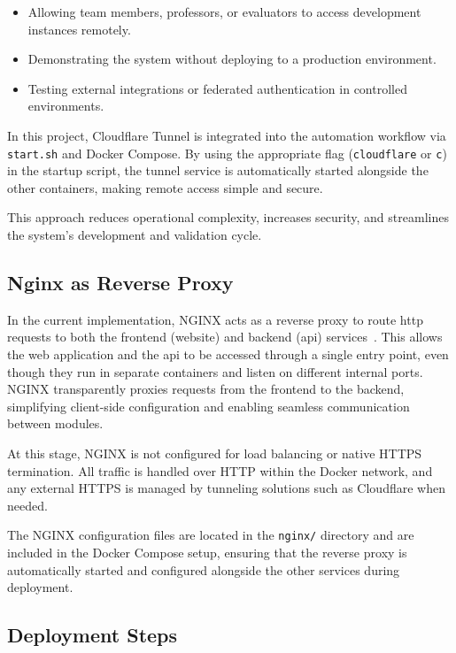 \begin{itemize}
    \item Allowing team members, professors, or evaluators to access development instances remotely.
    \item Demonstrating the system without deploying to a production environment.
    \item Testing external integrations or federated authentication in controlled environments.
\end{itemize}

In this project, Cloudflare Tunnel is integrated into the automation workflow via \texttt{start.sh} and Docker Compose. By using the appropriate flag (\texttt{cloudflare} or \texttt{c}) in the startup script, the tunnel service is automatically started alongside the other containers, making remote access simple and secure.

This approach reduces operational complexity, increases security, and streamlines the system's development and validation cycle.

\subsection{Nginx as Reverse Proxy} \label{subsec:nginx_reverse_proxy}

In the current implementation, NGINX acts as a reverse proxy to route \ac{http} requests to both the frontend (website) and backend (\ac{api}) services~\cite{nginx-docs}. This allows the web application and the \ac{api} to be accessed through a single entry point, even though they run in separate containers and listen on different internal ports. NGINX transparently proxies requests from the frontend to the backend, simplifying client-side configuration and enabling seamless communication between modules.

At this stage, NGINX is not configured for load balancing or native HTTPS termination. All traffic is handled over HTTP within the Docker network, and any external HTTPS is managed by tunneling solutions such as Cloudflare when needed.

The NGINX configuration files are located in the \texttt{nginx/} directory and are included in the Docker Compose setup, ensuring that the reverse proxy is automatically started and configured alongside the other services during deployment.

\subsection{Deployment Steps} \label{subsec:deployment_steps}

